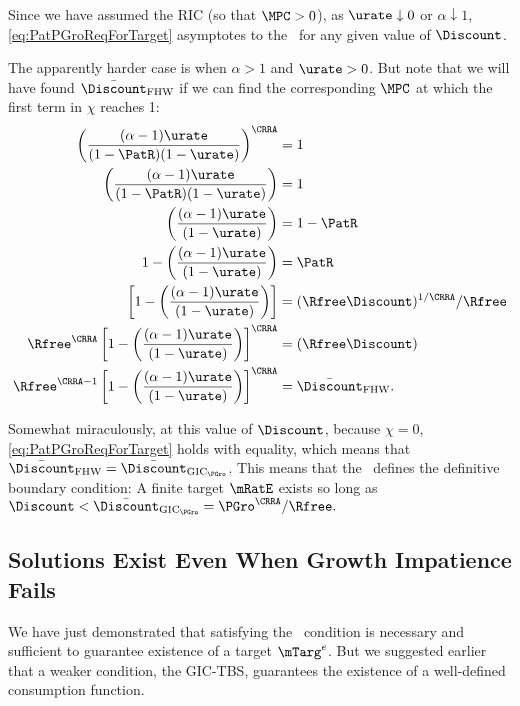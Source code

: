 \documentclass{\handout}
\begin{document}
Since we have assumed the RIC (so that $\MPCU > 0$), as $\urate \downarrow 0$ or $\alpha \downarrow 1$, \eqref{eq:PatPGroReqForTarget} asymptotes to the \GICPGro~for any given value of $\Discount$.  

The apparently harder case is when $\alpha>1$ and $\urate > 0$.  But note that we will have found $\DiscountMaxGICWhenFHWCTBSHolds$ if we can find the corresponding $\MPCU$ at which the first term in $\chi$ reaches 1:
\begin{equation}\begin{gathered}\begin{aligned}
    \left(\frac{(\alpha-1)\urate}{(1-\PatR) (1-\urate)}\right)^{\CRRA} & =  1
\\  \left(\frac{(\alpha-1)\urate}{(1-\PatR) (1-\urate)}\right) & =  1
\\  \left(\frac{(\alpha-1)\urate}{ (1-\urate)}\right) & =  1-\PatR
\\  1-\left(\frac{(\alpha-1)\urate}{ (1-\urate)}\right) & =  \PatR
\\                  \left[1-\left(\frac{(\alpha-1)\urate}{ (1-\urate)}\right)\right] & =  (\Rfree \Discount)^{1/\CRRA}/\Rfree
\\  \Rfree^{\CRRA}  \left[1-\left(\frac{(\alpha-1)\urate}{ (1-\urate)}\right)\right]^{\CRRA} & =  (\Rfree \Discount)
\\  \Rfree^{\CRRA-1}\left[1-\left(\frac{(\alpha-1)\urate}{ (1-\urate)}\right)\right]^{\CRRA} & =  \DiscountMaxGICWhenFHWCTBSHolds \label{eq:DiscountMaxGICWhenFHWCTBSHoldsAndGICPGroIsExactlySatisfied}
.\end{aligned}\end{gathered}\end{equation}

Somewhat miraculously, at this value of $\Discount$, because $\chi=0$, \eqref{eq:PatPGroReqForTarget} holds with equality, which means that $\DiscountMaxGICWhenFHWCTBSHolds=\DiscountMaxGICPGro$.  This means that the \GICPGro~defines the definitive boundary condition:  A finite target $\mRatE$ exists so long as $\Discount < \DiscountMaxGICPGro = \PGro^{\CRRA}/\Rfree.$

\subsection{Solutions Exist Even When Growth Impatience Fails}

We have just demonstrated that satisfying the \GICPGro~condition is necessary and sufficient to guarantee existence of a target $\mTarg^{e}$.  But we suggested earlier that a weaker condition, the GIC-TBS, guarantees the existence of a well-defined consumption function.
\end{document}
